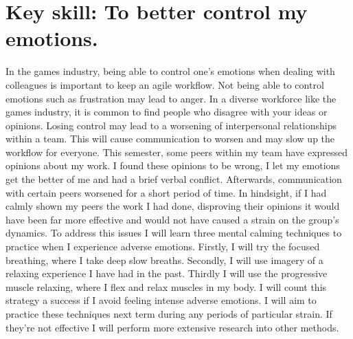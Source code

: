 \documentclass{scrartcl}
\begin{document}
\section{Key skill: To better control my emotions.}
In the games industry, being able to control one's emotions when dealing with colleagues is important to keep an agile workflow. Not being able to control emotions such as frustration may lead to anger. In a diverse workforce like the games industry, it is common to find people who disagree with your ideas or opinions. Losing control may lead to a worsening of interpersonal relationships within a team. This will cause communication to worsen and may slow up the workflow for everyone. This semester, some peers within my team have expressed opinions about my work. I found these opinions to be wrong, I let my emotions get the better of me and had a brief verbal conflict. Afterwards, communication with certain peers worsened for a short period of time. In hindsight, if I had calmly shown my peers the work I had done, disproving their opinions it would have been far more effective and would not have caused a strain on the group's dynamics. To address this issues I will learn three mental calming techniques to practice when I experience adverse emotions. Firstly, I will try the focused breathing, where I take deep slow breaths. Secondly, I will use imagery of a relaxing experience I have had in the past. Thirdly I will use the progressive muscle relaxing, where I flex and relax muscles in my body.  I will count this strategy a success if I avoid feeling intense adverse emotions. I will aim to practice these techniques next term during any periods of particular strain. If they're not effective I will perform more extensive research into other methods.
\end{document}
